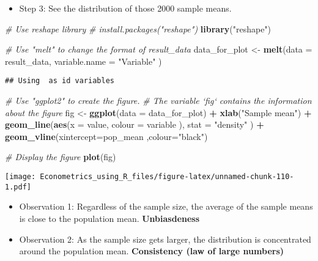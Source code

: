 \documentclass[]{book}
\newenvironment{Shaded}{\begin{snugshade}}{\end{snugshade}}
\newcommand{\KeywordTok}[1]{\textcolor[rgb]{0.13,0.29,0.53}{\textbf{#1}}}
\newcommand{\DataTypeTok}[1]{\textcolor[rgb]{0.13,0.29,0.53}{#1}}
\newcommand{\StringTok}[1]{\textcolor[rgb]{0.31,0.60,0.02}{#1}}
\newcommand{\CommentTok}[1]{\textcolor[rgb]{0.56,0.35,0.01}{\textit{#1}}}
\newcommand{\OperatorTok}[1]{\textcolor[rgb]{0.81,0.36,0.00}{\textbf{#1}}}
\newcommand{\NormalTok}[1]{#1}
\providecommand{\tightlist}{%
  \setlength{\itemsep}{0pt}\setlength{\parskip}{0pt}}
\begin{document}
\begin{itemize}
\tightlist
\item
  Step 3: See the distribution of those 2000 sample means.
\end{itemize}

\begin{Shaded}
\begin{Highlighting}[]
\CommentTok{# Use reshape library}
\CommentTok{# install.packages("reshape")}
\KeywordTok{library}\NormalTok{(}\StringTok{"reshape"}\NormalTok{)}

\CommentTok{# Use "melt" to change the format of result_data}
\NormalTok{data_for_plot <-}\StringTok{ }\KeywordTok{melt}\NormalTok{(}\DataTypeTok{data =}\NormalTok{ result_data, }\DataTypeTok{variable.name =} \StringTok{"Variable"}\NormalTok{ )}
\end{Highlighting}
\end{Shaded}

\begin{verbatim}
## Using  as id variables
\end{verbatim}

\begin{Shaded}
\begin{Highlighting}[]
\CommentTok{# Use "ggplot2" to create the figure.}
\CommentTok{# The variable `fig` contains the information about the figure}
\NormalTok{fig <-}\StringTok{ }
\StringTok{  }\KeywordTok{ggplot}\NormalTok{(}\DataTypeTok{data =}\NormalTok{ data_for_plot) }\OperatorTok{+}
\StringTok{  }\KeywordTok{xlab}\NormalTok{(}\StringTok{"Sample mean"}\NormalTok{) }\OperatorTok{+}\StringTok{ }
\StringTok{  }\KeywordTok{geom_line}\NormalTok{(}\KeywordTok{aes}\NormalTok{(}\DataTypeTok{x =}\NormalTok{ value, }\DataTypeTok{colour =}\NormalTok{ variable ),   }\DataTypeTok{stat =} \StringTok{"density"}\NormalTok{ ) }\OperatorTok{+}\StringTok{ }
\StringTok{  }\KeywordTok{geom_vline}\NormalTok{(}\DataTypeTok{xintercept=}\NormalTok{pop_mean ,}\DataTypeTok{colour=}\StringTok{"black"}\NormalTok{)}

\CommentTok{# Display the figure }
\KeywordTok{plot}\NormalTok{(fig)}
\end{Highlighting}
\end{Shaded}

\texttt{[image: Econometrics\_using\_R\_files/figure-latex/unnamed-chunk-110-1.pdf]}

\begin{itemize}
\tightlist
\item
  Observation 1: Regardless of the sample size, the average of the
  sample means is close to the population mean. \textbf{Unbiasdeness}
\item
  Observation 2: As the sample size gets larger, the distribution is
  concentrated around the population mean. \textbf{Consistency (law of
  large numbers)}
\end{itemize}
\end{document}
